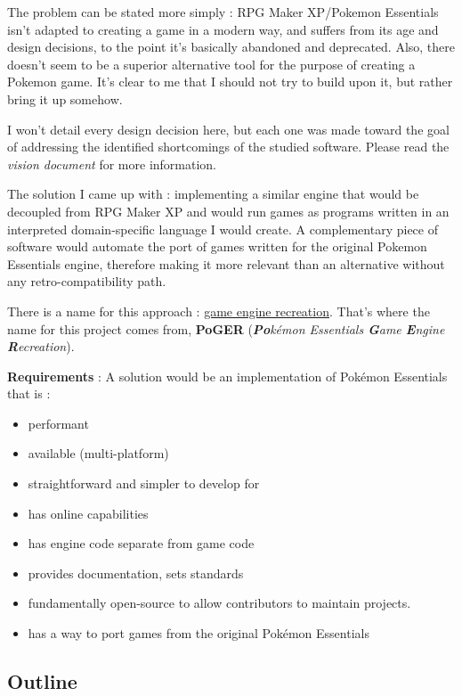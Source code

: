 \documentclass[11pt]{article}
\begin{document}
The problem can be stated more simply : RPG Maker XP/Pokemon Essentials isn't adapted to creating a game in a modern way, and suffers from its age and design decisions, to the point it's basically abandoned and deprecated. Also, there doesn't seem to be a superior alternative tool for the purpose of creating a Pokemon game. It's clear to me that I should not try to build upon it, but rather bring it up somehow.

I won't detail every design decision here, but each one was made toward the goal of addressing the identified shortcomings of the studied software. Please read the \textit{vision document} for more information.

The solution I came up with : implementing a similar engine that would be decoupled from RPG Maker XP  and would run games as programs written in an interpreted domain-specific language I would create. A complementary piece of software would automate the port of games written for the original Pokemon Essentials engine, therefore making it more relevant than an alternative without any retro-compatibility path.

There is a name for this approach : \href{https://en.wikipedia.org/wiki/Game_engine_recreation}{game engine recreation}.  That's where the name for this project comes from, \textbf{PoGER} (\textit{\textbf{Po}kémon Essentials \textbf{G}ame \textbf{E}ngine \textbf{R}ecreation}).

\textbf{Requirements} : A solution would be an implementation of Pokémon Essentials that is : 
\begin{itemize}
	\item performant
	\item available (multi-platform)
	\item straightforward and simpler to develop for
	\item has online capabilities
	\item has engine code separate from game code
	\item provides documentation, sets standards
	\item fundamentally open-source to allow contributors to maintain projects.
	\item has a way to port games from the original Pokémon Essentials
\end{itemize}

\vspace{4mm}

\subsection{Outline}
\end{document}
